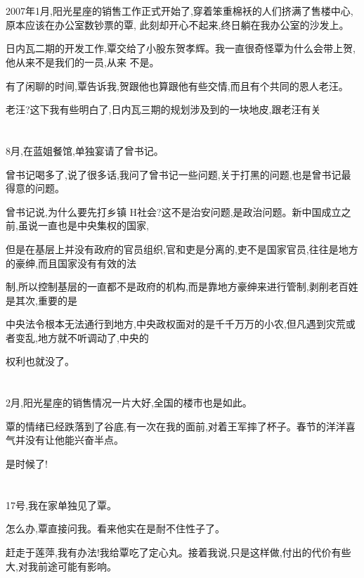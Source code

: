 \documentclass[11pt]{article}
\begin{document}
\section{}
2007年1月,阳光星座的销售工作正式开始了,穿着笨重棉袄的人们挤满了售楼中心,原本应该在办公室数钞票的覃,
此刻却开心不起来,终日躺在我办公室的沙发上。

日内瓦二期的开发工作,覃交给了小股东贺孝辉。我一直很奇怪覃为什么会带上贺,他从来不是我们的一员,从来
不是。

有了闲聊的时间,覃告诉我,贺跟他也算跟他有些交情,而且有个共同的恩人老汪。

老汪?这下我有些明白了,日内瓦三期的规划涉及到的一块地皮,跟老汪有关

\section{}
8月,在蓝姐餐馆,单独宴请了曾书记。

曾书记喝多了,说了很多话,我问了曾书记一些问题,关于打黑的问题,也是曾书记最得意的问题。

曾书记说,为什么要先打乡镇 H社会?这不是治安问题,是政治问题。新中国成立之前,虽说一直也是中央集权的国家,

但是在基层上并没有政府的官员组织,官和吏是分离的,吏不是国家官员,往往是地方的豪绅,而且国家没有有效的法

制,所以控制基层的一直都不是政府的机构,而是靠地方豪绅来进行管制,剥削老百姓是其次,重要的是

中央法令根本无法通行到地方,中央政权面对的是千千万万的小农,但凡遇到灾荒或者变乱,地方就不听调动了,中央的

权利也就没了。

\section{}
2月,阳光星座的销售情况一片大好,全国的楼市也是如此。

覃的情绪已经跌落到了谷底,有一次在我的面前,对着王军摔了杯子。春节的洋洋喜气并没有让他能兴奋半点。

是时候了!

\section{}
17号,我在家单独见了覃。

怎么办,覃直接问我。看来他实在是耐不住性子了。

赶走于莲萍,我有办法!我给覃吃了定心丸。接着我说,只是这样做,付出的代价有些大,对我前途可能有影响。
\end{document}
